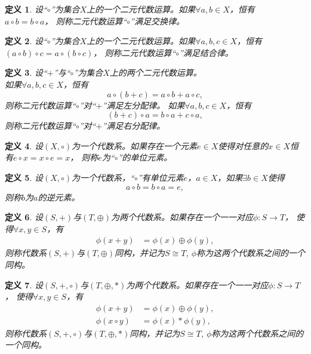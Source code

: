 \documentclass{article}
\newtheorem{Def}{定义}
\begin{document}
\begin{CJK*}{UTF8}{gbsn}
  \begin{Def}
    设“$\circ$”为集合$X$上的一个二元代数运算。如果$\forall a, b \in X$，恒有\\$a \circ b = b \circ a$， 则称二元代数运算“$\circ$”满足交换律。
  \end{Def}
  \begin{Def}
    设“$\circ$”为集合$X$上的一个二元代数运算。如果$\forall a, b, c \in X$，恒有$(a \circ b) \circ c = a \circ (b \circ c)$， 则称二元代数运算“$\circ$”满足结合律。
  \end{Def}
  \begin{Def}
    设“$+$”与“$\circ$”为集合$X$上的两个二元代数运算。\\如果$\forall a, b, c \in X$，恒有\[a \circ (b + c) = a \circ b + a \circ c,\] 则称二元代数运算“$\circ$”对“$+$”满足左分配律。
    如果$\forall a, b, c \in X$，恒有\[(b + c)\circ a = b \circ a + c \circ a,\] 则称二元代数运算“$\circ$”对“$+$”满足右分配律。
  \end{Def}
  \begin{Def}
    设$(X, \circ)$为一个代数系。如果存在一个元素$e\in X$使得对任意的$x\in X$恒有$e\circ x = x \circ e = x$， 则称$e$为“$\circ$”的单位元素。
  \end{Def}
  \begin{Def}
    设$(X, \circ)$为一个代数系，“$\circ$”有单位元素$e$，$a\in X$，如果$\exists b\in X$使得\[a\circ b = b \circ a = e,\]  则称$b$为$a$的逆元素。
  \end{Def}
  \begin{Def}
    设$(S,+)$与$(T, \oplus)$为两个代数系。如果存在一个一一对应$\phi:S\to T$， 使得$\forall x, y \in S$，有
    \begin{align*}
      \phi(x+y) &= \phi(x) \oplus \phi(y),
    \end{align*}
    则称代数系$(S,+)$与$(T, \oplus)$同构，并记为$S\cong T$, $\phi$称为这两个代数系之间的一个同构。
  \end{Def}
  \begin{Def}
    设$(S,+, \circ)$与$(T, \oplus, *)$为两个代数系。如果存在一个一一对应$\phi:S\to T$， 使得$\forall x, y \in S$，有
    \begin{align*}
      \phi(x+y) &= \phi(x) \oplus \phi(y),\\
      \phi(x\circ y)&= \phi(x) * \phi(y),
    \end{align*}
    则称代数系$(S,+,\circ)$与$(T, \oplus, *)$同构，并记为$S\cong T$, $\phi$称为这两个代数系之间的一个同构。
  \end{Def}
  \begin{tabular}{cc|c}

\end{tabular}
\end{CJK*}
\end{document}
